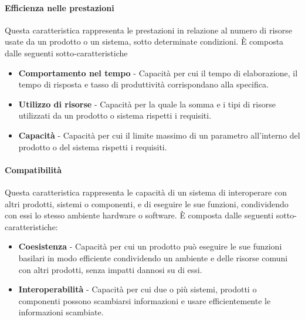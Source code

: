 \paragraph{Efficienza nelle prestazioni}
Questa caratteristica rappresenta le prestazioni in relazione al numero di risorse usate da un prodotto o un sistema, sotto determinate condizioni.
È composta dalle seguenti sotto-caratteristiche
\begin{itemize}
\item \textbf{Comportamento nel tempo} - Capacità per cui il tempo di elaborazione, il tempo di risposta e tasso di produttività corrispondano alla specifica.
\item \textbf{Utilizzo di risorse} - Capacità per la quale la somma e i tipi di risorse utilizzati da un prodotto o sistema rispetti i requisiti.
\item \textbf{Capacità} - Capacità per cui il limite massimo di un parametro all'interno del prodotto o del sistema rispetti i requisiti.
\end{itemize}

\paragraph{Compatibilità}
Questa caratteristica rappresenta le capacità di un sistema di interoperare con altri prodotti, sistemi o componenti, e di eseguire le sue funzioni, condividendo con essi lo stesso ambiente hardware o software. È composta dalle seguenti sotto-caratteristiche:
\begin{itemize}
\item \textbf{Coesistenza} - Capacità per cui un prodotto può eseguire le sue funzioni basilari in modo efficiente condividendo un ambiente e delle risorse comuni con altri prodotti, senza impatti dannosi su di essi.
\item \textbf{Interoperabilità} - Capacità per cui due o più sistemi, prodotti o componenti possono scambiarsi informazioni e usare efficientemente le informazioni scambiate.
\end{itemize}

